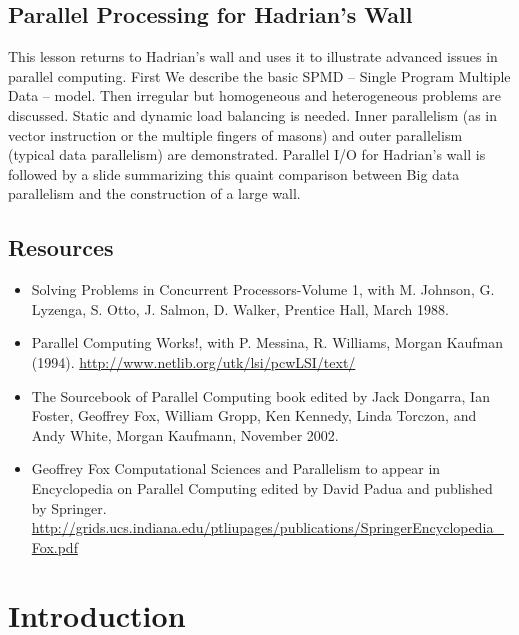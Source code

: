 
\subsection{Parallel Processing for Hadrian's Wall}

This lesson returns to Hadrian's wall and uses it to illustrate advanced
issues in parallel computing. First We describe the basic SPMD -- Single
Program Multiple Data -- model. Then irregular but homogeneous and
heterogeneous problems are discussed. Static and dynamic load balancing
is needed. Inner parallelism (as in vector instruction or the multiple
fingers of masons) and outer parallelism (typical data parallelism) are
demonstrated. Parallel I/O for Hadrian's wall is followed by a slide
summarizing this quaint comparison between Big data parallelism and the
construction of a large wall.


\subsection{Resources}

\begin{itemize}
\item
  Solving Problems in Concurrent Processors-Volume 1, with M. Johnson,
  G. Lyzenga, S. Otto, J. Salmon, D. Walker, Prentice Hall, March 1988.
\item
  Parallel Computing Works!, with P. Messina, R. Williams, Morgan
  Kaufman (1994). \url{http://www.netlib.org/utk/lsi/pcwLSI/text/}
\item
  The Sourcebook of Parallel Computing book edited by Jack Dongarra, Ian
  Foster, Geoffrey Fox, William Gropp, Ken Kennedy, Linda Torczon, and
  Andy White, Morgan Kaufmann, November 2002.
\item
  Geoffrey Fox Computational Sciences and Parallelism to appear in
  Encyclopedia on Parallel Computing edited by David Padua and published
  by Springer.
  \url{http://grids.ucs.indiana.edu/ptliupages/publications/SpringerEncyclopedia_Fox.pdf}
\end{itemize}

\section{Introduction}

